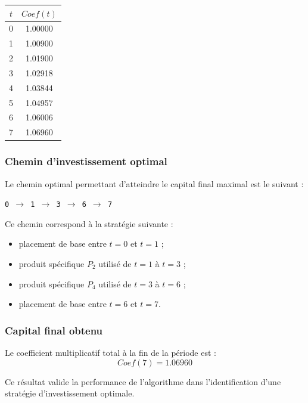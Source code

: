 \documentclass[a4paper,11pt]{article}
\begin{document}
\begin{center}
\begin{tabular}{|c|c|}
\hline
$t$ & $Coef(t)$ \\
\hline
0 & 1.00000 \\
1 & 1.00900 \\
2 & 1.01900 \\
3 & 1.02918 \\
4 & 1.03844 \\
5 & 1.04957 \\
6 & 1.06006 \\
7 & 1.06960 \\
\hline
\end{tabular}
\end{center}

\vspace{0.4cm}

\subsubsection{Chemin d’investissement optimal}

Le chemin optimal permettant d’atteindre le capital final maximal est le suivant :

\begin{center}
\texttt{0 $\rightarrow$ 1 $\rightarrow$ 3 $\rightarrow$ 6 $\rightarrow$ 7}
\end{center}

Ce chemin correspond à la stratégie suivante :
\begin{itemize}
    \item placement de base entre $t = 0$ et $t = 1$ ;
    \item produit spécifique $P_2$ utilisé de $t = 1$ à $t = 3$ ;
    \item produit spécifique $P_4$ utilisé de $t = 3$ à $t = 6$ ;
    \item placement de base entre $t = 6$ et $t = 7$.
\end{itemize}

\vspace{0.3cm}

\subsubsection{Capital final obtenu}

Le coefficient multiplicatif total à la fin de la période est :
\[
\boxed{Coef(7) = 1.06960}
\]

Ce résultat valide la performance de l’algorithme dans l’identification d’une stratégie d’investissement optimale.
\end{document}
